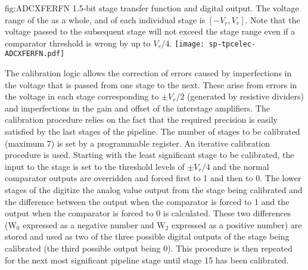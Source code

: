 \begin{dunefigure}
{fig:ADCXFERFN}
{\num{1.5}-bit stage transfer function and digital output. The voltage 
range of the  as a whole, and of each individual stage 
is $[-V_r,V_r]$.  Note that the voltage passed to the subsequent 
stage will not exceed the stage range even if a comparator threshold 
is wrong by up to $V_r/4$.}
\texttt{[image: sp-tpcelec-ADCXFERFN.pdf]}
\end{dunefigure}

The calibration logic allows the correction of errors caused by imperfections
in the voltage that is passed from one stage to the next.  These arise from
errors in the voltage in each stage corresponding to $\pm V_r/2$
(generated by resistive dividers) and imperfections in the gain and offset of
the interstage amplifiers.  The calibration procedure relies on the fact that
the required precision is easily satisfied by the last stages of the pipeline.
The number of stages to be calibrated (maximum \num{7}) is set by a programmable
register.  An iterative calibration procedure is used.  Starting with the least
significant stage to be calibrated, the input to the stage is set to the threshold
levels of $\pm V_r/4$ and the normal comparator outputs are overridden
and forced first to \num{1} and then to \num{0}.  The lower stages of the  digitize
the analog value output from the stage being calibrated and the difference between
the  output when the comparator is forced to \num{1} and the 
output when the comparator is forced to \num{0} is calculated.  These two differences
(W$_0$ expressed as a negative number and W$_2$ expressed as a positive number) are
stored and used as two of the three possible digital outputs of the stage being
calibrated (the third possible output being \num{0}).  This procedure is then repeated
for the next most significant pipeline stage until stage \num{15} has been calibrated.

